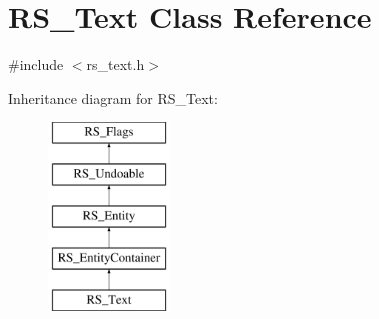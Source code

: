 \hypertarget{classRS__Text}{\section{R\-S\-\_\-\-Text Class Reference}
\label{classRS__Text}
}


{\ttfamily \#include $<$rs\-\_\-text.\-h$>$}

Inheritance diagram for R\-S\-\_\-\-Text\-:\begin{figure}[H]
\begin{center}
\leavevmode
\includegraphics[height=5.000000cm]{classRS__Text}
\end{center}
\end{figure}
